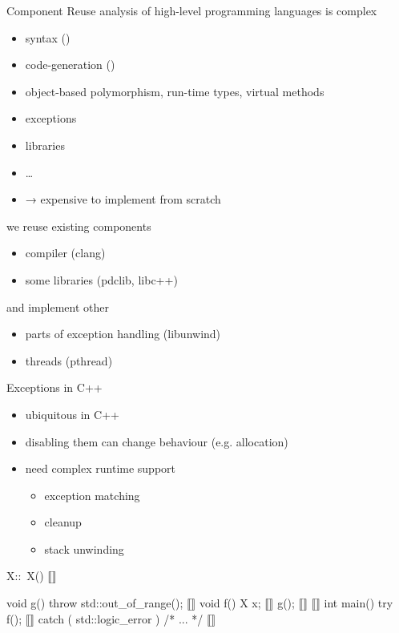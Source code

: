 \documentclass[aspectratio=169]{paradise-slide}
\begin{document}
\begin{frame}{Component Reuse}
  analysis of high-level programming languages is complex
  \begin{itemize}
    \item syntax ()
    \item code-generation ()
    \item object-based polymorphism, run-time types, virtual methods
    \item exceptions
    \item libraries
    \item … \pause
    \item → expensive to implement from scratch
  \end{itemize}

  \pause\bigskip
  we reuse existing components
  \begin{itemize}
    \item compiler (clang)
    \item some libraries (pdclib, libc++)
  \end{itemize}

  and implement other
  \begin{itemize}
    \item parts of exception handling (libunwind)
    \item threads (pthread)
  \end{itemize}
\end{frame}

\begin{frame}[fragile]{Exceptions in C++}
  \begin{minipage}{0.47\textwidth}
    \setlength{\leftmargini}{1em}
    \begin{itemize}
      \item ubiquitous in C++
      \item disabling them can change behaviour (e.g. allocation)
      \item need complex runtime support
        \begin{itemize}
          \item exception matching
          \item cleanup
          \item stack unwinding
        \end{itemize}
    \end{itemize}
  \end{minipage}
  \hfill
  \pause
  \newcommand{\arr}[1]{\visible<#1>{\textcolor{red}{$\mathbf{\longleftarrow}$}}}
  \begin{minipage}{0.47\textwidth}
    \begin{cppcodeln}
      X::~X() { } ⟦\arr{7}⟧

      void g() {
        throw std::out_of_range(); ⟦\arr{5}⟧
      }
      void f() {
        X x; ⟦\arr{3}⟧
        g(); ⟦\arr{4}⟧
      } ⟦\arr{6}⟧
      int main() {
        try {
          f(); ⟦\arr{2}⟧
        } catch ( std::logic_error ) {
          /* ... */ ⟦\arr{8}⟧
        }
      }
    \end{cppcodeln}
  \end{minipage}
\end{frame}
\end{document}
